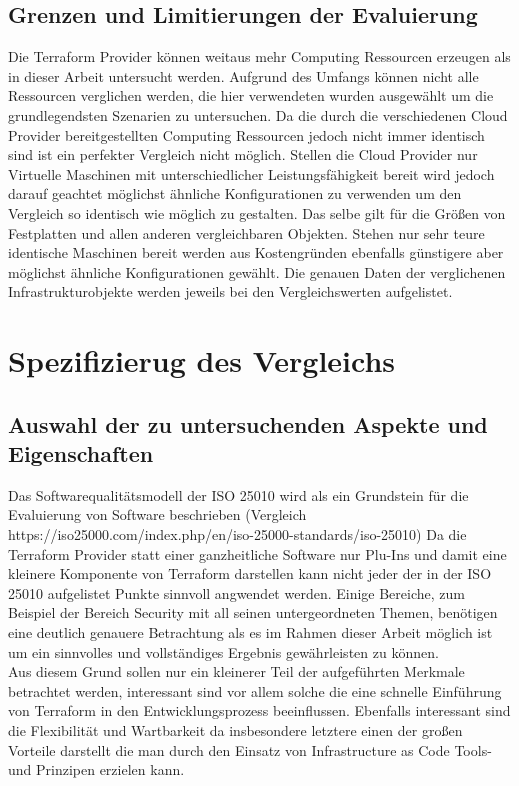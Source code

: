 \subsection{Grenzen und Limitierungen der Evaluierung}

Die Terraform Provider können weitaus mehr Computing Ressourcen erzeugen
als in dieser Arbeit untersucht werden. Aufgrund des Umfangs können
nicht alle Ressourcen verglichen werden, die hier verwendeten wurden
ausgewählt um die grundlegendsten Szenarien zu untersuchen. Da die durch
die verschiedenen Cloud Provider bereitgestellten Computing Ressourcen
jedoch
nicht immer identisch sind ist ein perfekter Vergleich nicht möglich.
Stellen die Cloud Provider nur Virtuelle Maschinen mit unterschiedlicher
Leistungsfähigkeit bereit wird jedoch darauf geachtet möglichst ähnliche
Konfigurationen zu verwenden um den Vergleich so identisch wie möglich zu
gestalten. Das selbe gilt für die Größen von Festplatten und allen anderen
vergleichbaren Objekten. Stehen nur sehr teure identische Maschinen bereit
werden aus Kostengründen ebenfalls günstigere aber möglichst ähnliche
Konfigurationen gewählt. Die genauen Daten der verglichenen
Infrastrukturobjekte werden jeweils bei den Vergleichswerten aufgelistet.

\section{Spezifizierug des Vergleichs}

\subsection{Auswahl der zu untersuchenden Aspekte und Eigenschaften}

Das Softwarequalitätsmodell der ISO 25010 wird als ein Grundstein für die
Evaluierung von Software beschrieben (Vergleich https://iso25000.com/index.php/en/iso-25000-standards/iso-25010)
Da die Terraform Provider statt einer ganzheitliche Software nur Plu-Ins
und damit eine kleinere Komponente von Terraform darstellen kann nicht
jeder der in der ISO 25010 aufgelistet Punkte sinnvoll angwendet werden.
Einige Bereiche, zum Beispiel der Bereich Security mit all seinen
untergeordneten Themen, benötigen eine deutlich genauere Betrachtung als
es im Rahmen dieser Arbeit möglich ist um ein sinnvolles und vollständiges
Ergebnis gewährleisten zu können.\\
Aus diesem Grund sollen nur ein kleinerer Teil der aufgeführten Merkmale
betrachtet werden, interessant sind vor allem solche die eine schnelle
Einführung von Terraform in den Entwicklungsprozess beeinflussen.
Ebenfalls interessant sind die Flexibilität und Wartbarkeit da
insbesondere letztere einen der großen Vorteile darstellt die man durch
den Einsatz von Infrastructure as Code Tools- und Prinzipen erzielen kann.

